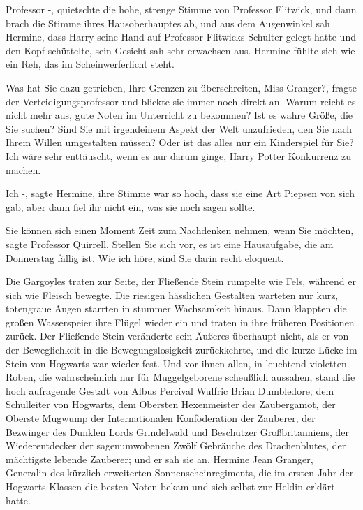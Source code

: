 \glqq{}Professor -\grqq{}, quietschte die hohe, strenge Stimme von Professor
Flitwick, und dann brach die Stimme ihres Hausoberhauptes ab, und aus dem
Augenwinkel sah Hermine, dass Harry seine Hand auf Professor Flitwicks Schulter
gelegt hatte und den Kopf schüttelte, sein Gesicht sah sehr erwachsen aus.
Hermine fühlte sich wie ein Reh, das im Scheinwerferlicht steht.

\glqq{}Was hat Sie dazu getrieben, Ihre Grenzen zu überschreiten, Miss
Granger?\grqq{}, fragte der Verteidigungsprofessor und blickte sie immer noch
direkt an. \glqq{}Warum reicht es nicht mehr aus, gute Noten im Unterricht zu
bekommen? Ist es wahre Größe, die Sie suchen? Sind Sie mit irgendeinem Aspekt
der Welt unzufrieden, den Sie nach Ihrem Willen umgestalten müssen? Oder ist das
alles nur ein Kinderspiel für Sie? Ich wäre sehr enttäuscht, wenn es nur darum
ginge, Harry Potter Konkurrenz zu machen.\grqq{}

\glqq{}Ich -\grqq{}, sagte Hermine, ihre Stimme war so hoch, dass sie eine Art
Piepsen von sich gab, aber dann fiel ihr nicht ein, was sie noch sagen sollte.

\glqq{}Sie können sich einen Moment Zeit zum Nachdenken nehmen, wenn Sie
möchten\grqq{}, sagte Professor Quirrell. \glqq{}Stellen Sie sich vor, es ist
eine Hausaufgabe, die am Donnerstag fällig ist. Wie ich höre, sind Sie darin
recht eloquent.\grqq{}

Die Gargoyles traten zur Seite, der Fließende Stein rumpelte wie Fels, während
er sich wie Fleisch bewegte. Die riesigen hässlichen Gestalten warteten nur
kurz, totengraue Augen starrten in stummer Wachsamkeit hinaus. Dann klappten die
großen Wasserspeier ihre Flügel wieder ein und traten in ihre früheren
Positionen zurück. Der Fließende Stein veränderte sein Äußeres überhaupt nicht,
als er von der Beweglichkeit in die Bewegungslosigkeit zurückkehrte, und die
kurze Lücke im Stein von Hogwarts war wieder fest. Und vor ihnen allen, in
leuchtend violetten Roben, die wahrscheinlich nur für Muggelgeborene scheußlich
aussahen, stand die hoch aufragende Gestalt von Albus Percival Wulfric Brian
Dumbledore, dem Schulleiter von Hogwarts, dem Obersten Hexenmeister des
Zaubergamot, der Oberste Mugwump der Internationalen Konföderation der Zauberer,
der Bezwinger des Dunklen Lords Grindelwald und Beschützer Großbritanniens, der
Wiederentdecker der sagenumwobenen Zwölf Gebräuche des Drachenblutes, der
mächtigste lebende Zauberer; und er sah sie an, Hermine Jean Granger, Generalin
des kürzlich erweiterten Sonnenscheinregiments, die im ersten Jahr der
Hogwarts-Klassen die besten Noten bekam und sich selbst zur Heldin erklärt
hatte.

